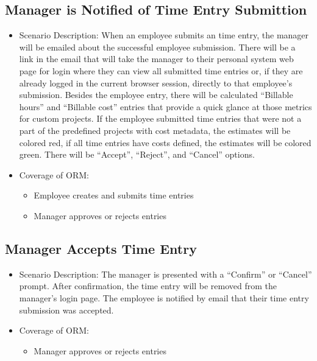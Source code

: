 \documentclass[12pt]{article}
\begin{document}
\subsection{ Manager is Notified of Time Entry Submittion}
\begin{itemize}
\item Scenario Description: When an employee submits an time entry, the manager will be emailed about the successful employee submission. There will be a link in the email that will take the manager to their personal system web page for login where they can view all submitted time entries or, if they are already logged in the current browser session, directly to that employee’s submission. Besides the employee entry, there will be calculated “Billable hours” and “Billable cost” entries that provide a quick glance at those metrics for custom projects. If the employee submitted time entries that were not a part of the predefined projects with cost metadata, the estimates will be colored red, if all time entries have costs defined, the estimates will be colored green. There will be “Accept”, “Reject”, and “Cancel” options.
\item Coverage of ORM:
\begin{itemize}
\item Employee creates and submits time entries
\item Manager approves or rejects entries
\end{itemize}
\end{itemize}

\subsection{ Manager Accepts Time Entry}
\begin{itemize}
\item Scenario Description: The manager is presented with a “Confirm” or “Cancel” prompt. After confirmation, the time entry will be removed from the manager’s login page. The employee is notified by email that their time entry submission was accepted.
\item Coverage of ORM:
\begin{itemize}
\item Manager approves or rejects entries
\end{itemize}
\end{itemize}
\end{document}
